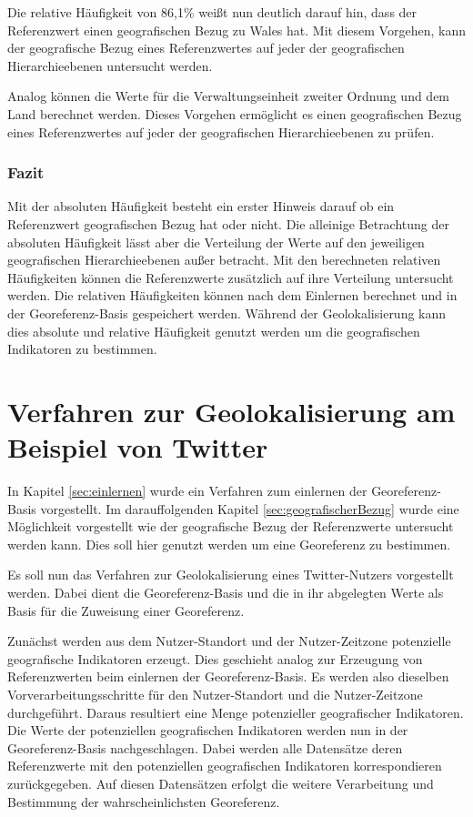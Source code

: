 			Die relative Häufigkeit von 86,1\% weißt nun deutlich darauf hin, dass der Referenzwert einen geografischen Bezug zu Wales hat.
			Mit diesem Vorgehen, kann der geografische Bezug eines Referenzwertes auf jeder der geografischen Hierarchieebenen untersucht werden.

			Analog können die Werte für die Verwaltungseinheit zweiter Ordnung und dem Land berechnet werden.
			Dieses Vorgehen ermöglicht es einen geografischen Bezug eines Referenzwertes auf jeder der geografischen Hierarchieebenen zu prüfen.

		\subsubsection{Fazit}

			Mit der absoluten Häufigkeit besteht ein erster Hinweis darauf ob ein Referenzwert geografischen Bezug hat oder nicht.
			Die alleinige Betrachtung der absoluten Häufigkeit lässt aber die Verteilung der Werte auf den jeweiligen geografischen Hierarchieebenen außer betracht.
			Mit den berechneten relativen Häufigkeiten können die Referenzwerte zusätzlich auf ihre Verteilung untersucht werden.
			Die relativen Häufigkeiten können nach dem Einlernen berechnet und in der Georeferenz-Basis gespeichert werden. 
			Während der Geolokalisierung kann dies absolute und relative Häufigkeit genutzt werden um die geografischen Indikatoren zu bestimmen. 

	\section{Verfahren zur Geolokalisierung am Beispiel von Twitter}

		In Kapitel \ref{sec:einlernen} wurde ein Verfahren zum einlernen der Georeferenz-Basis vorgestellt. 
		Im darauffolgenden Kapitel \ref{sec:geografischerBezug} wurde eine Möglichkeit vorgestellt wie der geografische Bezug der Referenzwerte untersucht werden kann.
		Dies soll hier genutzt werden um eine Georeferenz zu bestimmen. 

		Es soll nun das Verfahren zur Geolokalisierung eines Twitter-Nutzers vorgestellt werden.
		Dabei dient die Georeferenz-Basis und die in ihr abgelegten Werte als Basis für die Zuweisung einer Georeferenz.

		Zunächst werden aus dem Nutzer-Standort und der Nutzer-Zeitzone potenzielle geografische Indikatoren erzeugt.
		Dies geschieht analog zur Erzeugung von Referenzwerten beim einlernen der Georeferenz-Basis.
		Es werden also dieselben Vorverarbeitungsschritte für den Nutzer-Standort und die Nutzer-Zeitzone durchgeführt.
		Daraus resultiert eine Menge potenzieller geografischer Indikatoren.
		Die Werte der potenziellen geografischen Indikatoren werden nun in der Georeferenz-Basis nachgeschlagen. 
		Dabei werden alle Datensätze deren Referenzwerte mit den potenziellen geografischen Indikatoren korrespondieren zurückgegeben.
		Auf diesen Datensätzen erfolgt die weitere Verarbeitung und Bestimmung der wahrscheinlichsten Georeferenz.
		
